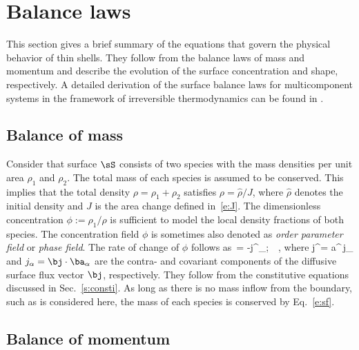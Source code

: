 \documentclass[11pt]{article}
\begin{document}
\section{Balance laws}\label{s:bal}

This section gives a brief summary of the equations that govern the physical behavior of thin shells. 
They follow from the balance laws of mass and momentum and describe the evolution of the surface concentration and shape, respectively. 
A detailed derivation of the surface balance laws for multicomponent systems in the framework of irreversible thermodynamics can be found in \cite{sahu17}.

\subsection{Balance of mass}

Consider that surface $\sS$ consists of two species with the mass densities per unit area $\rho_1$ and $\rho_2$. 
The total mass of each species is assumed to be conserved. This implies that the total density $\rho=\rho_1+\rho_2$ satisfies $\rho = \hat\rho/J$, where $\hat\rho$ denotes the initial density and $J$ is the area change defined in~\eqref{e:J}.
The dimensionless concentration $\phi:=\rho_{1}/\rho$ is sufficient to model the local density fractions of both species. 
The concentration field $\phi$ is sometimes also denoted as \textit{order parameter field} or \textit{phase field}.
The rate of change of $\phi$ follows as 
\rho\,\dot\phi = -j^\alpha_{;\alpha}~\quad\forall\,\bx\in\sS
\label{e:sf}\eqe
\citep{sahu17}, where
j^\alpha = a^{\alpha\beta}\,j_\beta %
\eqe
and $j_\alpha=\bj\cdot\ba_\alpha$ are the contra- and covariant components of the diffusive surface flux vector $\bj$, respectively. 
They follow from the constitutive equations discussed in Sec.~\ref{s:consti}. As long as there is no mass inflow from the boundary, such as is considered here, the mass of each species is conserved by Eq.~\eqref{e:sf}.

\subsection{Balance of momentum}\label{s:mombal}
\end{document}

